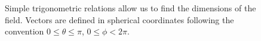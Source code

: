 \documentclass[10 pt]{article}
\begin{document}
\begin{figure}[H]
\centering
{}
\caption{Simple trigonometric relations allow us to find the dimensions of the field. Vectors are defined in spherical coordinates following the convention $0 \leq \theta \leq \pi$, $0 \leq \phi < 2\pi$.}
\end{figure}
\end{document}
